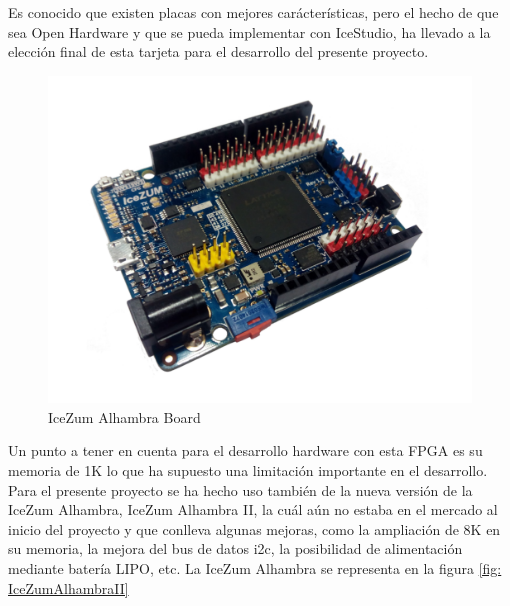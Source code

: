Es conocido que existen placas con mejores carácterísticas, pero el hecho de que sea Open Hardware y que se pueda implementar con IceStudio, ha llevado a la elección final de esta tarjeta para el desarrollo del presente proyecto.\newline
\begin{center}
\begin{figure}[H]
	\center
	\includegraphics[scale=0.4]{imagenes/EstadoArte/IceZumAlhambra.pdf}
	\caption{IceZum Alhambra Board}
	\label{fig:IceZumAlhambraI}
\end{figure} 
\end{center}
Un punto a tener en cuenta para el desarrollo hardware con esta FPGA es su memoria de 1K lo que ha supuesto una limitación importante en el desarrollo. Para el presente proyecto se ha hecho uso también de la nueva versión de la IceZum Alhambra, IceZum Alhambra II, la cuál aún no estaba en el mercado al inicio del proyecto y que conlleva algunas mejoras, como la ampliación de 8K en su memoria, la mejora del bus de datos i2c, la posibilidad de alimentación mediante batería LIPO, etc. \newline
La IceZum Alhambra se representa en la figura \ref{fig: IceZumAlhambraII}
